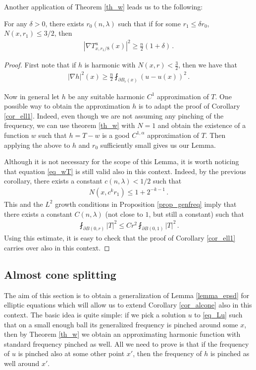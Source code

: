 \documentclass[11pt]{article}
\begin{document}
Another application of Theorem \ref{th_w} leads us to the following:

\begin{lemma}\label{lemma_ell3/2}
 For any $\delta>0$, there exists $r_0(n,\lambda)$ such that if for some $r_1\leq \delta r_0$, $N(x,r_1)\leq 3/2$, then
 \begin{gather}
  {\left|{\nabla T^u_{x,r_1/8} (x) }\right|}^2 \geq \frac{n}{2} (1+\delta) \, .
 \end{gather}
\end{lemma}
\begin{proof}
First note that if $h$ is harmonic with $N(x,r)<\frac{3}{2}$, then we have that
\begin{align}
|\nabla h|^2(x)\geq \frac{n}{2}\fint_{\partial B_r(x)}(u-u(x))^2\, .
\end{align}

Now in general let $h$ be any suitable harmonic $C^1$ approximation of $T$.  One possible way to obtain the approximation $h$ is to adapt the proof of Corollary \ref{cor_ell1}. Indeed, even though we are not assuming any pinching of the frequency, we can use theorem \ref{th_w} with $N=1$ and obtain the existence of a function $w$ such that $h=T-w$ is a good $C^{1,\alpha}$ approximation of $T$.  Then applying the above to $h$ and $r_0$ sufficiently small gives us our Lemma.

Although it is not necessary for the scope of this Lemma, it is worth noticing that equation \eqref{eq_wT} is still valid also in this context. Indeed, by the previous corollary, there exists a constant $c(n,\lambda)<1/2$ such that
\begin{gather}
 N(x,c^k r_1)\leq 1+2^{-k-1}\, .
\end{gather}
This and the $L^2$ growth conditions in Proposition \ref{prop_genfreq} imply that there exists a constant $C(n,\lambda)$ (not close to $1$, but still a constant) such that
\begin{gather}
 \fint_{\partial B(0,r)} {\left|T\right|}^2 \leq C r^2 \fint_{\partial B(0,1)}{\left|T\right|}^2\, .
\end{gather}
Using this estimate, it is easy to check that the proof of Corollary \ref{cor_ell1} carries over also in this context.
\end{proof}

\subsection{Almost cone splitting}
The aim of this section is to obtain a generalization of Lemma \ref{lemma_epsd} for elliptic equations which will allow us to extend Corollary \ref{cor_alcone} also in this context. The basic idea is quite simple: if we pick a solution $u$ to \eqref{eq_Lu} such that on a small enough ball its generalized frequency is pinched around some $x$, then by Theorem \ref{th_w} we obtain an approximating harmonic function with standard frequency pinched as well. All we need to prove is that if the frequency of $u$ is pinched also at some other point $x'$, then the frequency of $h$ is pinched as well around $x'$.
\end{document}
